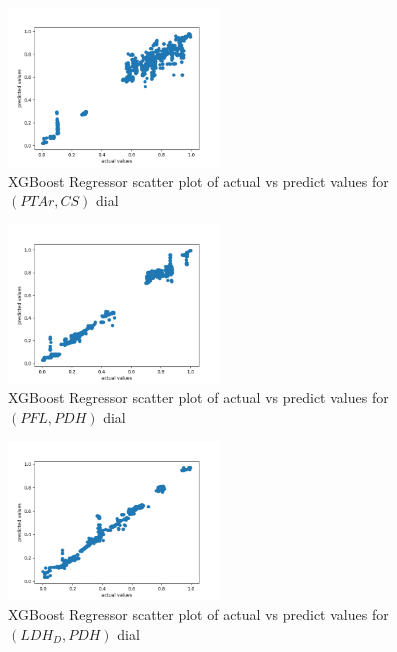 \documentclass[12pt,chapterheads]{ucsd}
\begin{document}
\begin{figure}[h] 
\centering
\includegraphics[width=0.5\textwidth]{Figures/PTAr_CS_xgboost_no_params}
\caption[XGBoost Regressor scatter plot of actual vs predict values for $(PTAr, CS)$ dial]
{XGBoost Regressor scatter plot of actual vs predict values for $(PTAr, CS)$ dial}
\label{fig:PtarCsXgb}
\end{figure}

\begin{figure}[h] 
\centering
\includegraphics[width=0.5\textwidth]{Figures/PFL_PDH_xgboost_no_params}
\caption[XGBoost Regressor scatter plot of actual vs predict values for $(PFL, PDH)$ dial]
{XGBoost Regressor scatter plot of actual vs predict values for $(PFL, PDH)$ dial}
\label{fig:PflPdhXgb}
\end{figure}

\begin{figure}[h] 
\centering
\includegraphics[width=0.5\textwidth]{Figures/LDH_D_PDH_xgboost_no_params}
\caption[XGBoost scatter plot of actual vs predict values for \string(LDH\textunderscore D, PDH) dial]
{XGBoost Regressor scatter plot of actual vs predict values for $(LDH_D, PDH)$ dial}
\label{fig:LdhPdhXgb}
\end{figure}
\end{document}
